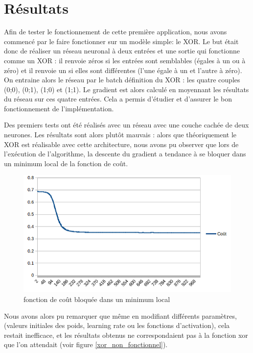 \documentclass{report}
\theoremstyle{plain}
\theoremstyle{definition}
\theoremstyle{remark}
\begin{document}
\section{Résultats}

Afin de tester le fonctionnement de cette première application, nous avons commencé par le faire fonctionner sur un modèle simple: le XOR. Le but était donc de réaliser un réseau neuronal à deux entrées et une sortie qui fonctionne comme un XOR : il renvoie zéros si les entrées sont semblables (égales à un ou à zéro) et il renvoie un si elles sont différentes (l'une égale à un et l'autre à zéro). On entraine alors le réseau par le batch définition du XOR : les quatre couples (0;0), (0;1), (1;0) et (1;1). Le gradient est alors calculé en moyennant les résultats du réseau sur ces quatre entrées.
Cela a permis d'étudier et d'assurer le bon fonctionnement de l'implémentation.

Des premiers tests ont été réalisés avec un réseau avec une couche cachée de deux neurones. Les résultats sont alors plutôt mauvais : alors que théoriquement le XOR est réalisable avec cette architecture, nous avons pu observer que lors de l'exécution de l'algorithme, la descente du gradient a tendance à se bloquer dans un minimum local de la fonction de coût. 

\begin{figure}[!h]
\begin{center}
\includegraphics[scale=0.6]{images/xor_cost_function.png}
\caption{fonction de coût bloquée dans un minimum local}
\label{xor_cout_bloque}
\end{center}
\end{figure}

Nous avons alors pu remarquer que même en modifiant différents paramètres, (valeurs initiales des poids, learning rate ou les fonctions d'activation), cela restait inefficace, et les résultats obtenus ne correspondaient pas à la fonction xor que l'on attendait (voir figure \ref{xor_non_fonctionnel}).
\end{document}
